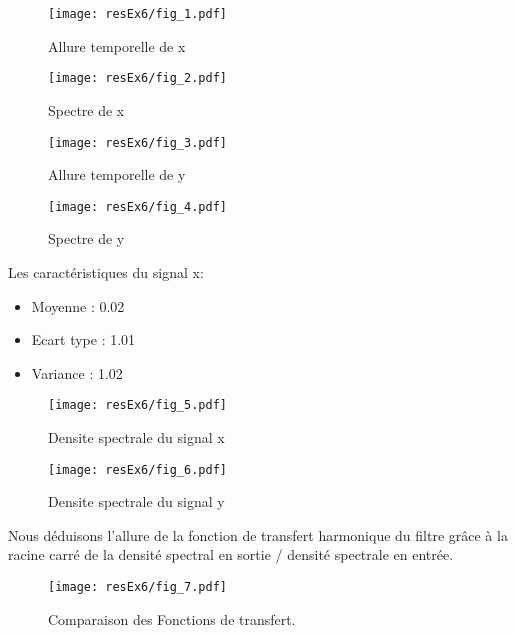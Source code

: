 

\begin{figure}[H]
\centering
\texttt{[image: resEx6/fig\_1.pdf]}
\caption{Allure temporelle de x}
\end{figure}


\begin{figure}[H]
\centering
\texttt{[image: resEx6/fig\_2.pdf]}
\caption{Spectre de x}
\end{figure}


\begin{figure}[H]
\centering
\texttt{[image: resEx6/fig\_3.pdf]}
\caption{Allure temporelle de y}
\end{figure}


\begin{figure}[H]
\centering
\texttt{[image: resEx6/fig\_4.pdf]}
\caption{Spectre de y}
\end{figure}


Les caractéristiques du signal x:\\
\begin{itemize}
\item Moyenne : 0.02
\item Ecart type : 1.01
\item Variance : 1.02
\end{itemize}


\begin{figure}[H]
\centering
\texttt{[image: resEx6/fig\_5.pdf]}
\caption{Densite spectrale du signal x}
\end{figure}


\begin{figure}[H]
\centering
\texttt{[image: resEx6/fig\_6.pdf]}
\caption{Densite spectrale du signal y}
\end{figure}



Nous déduisons l’allure de la fonction de transfert harmonique du filtre grâce à la racine carré de la densité spectral en sortie / densité spectrale en entrée.

\begin{figure}[H]
\centering
\texttt{[image: resEx6/fig\_7.pdf]}
\caption{Comparaison des Fonctions de transfert.}
\end{figure}

